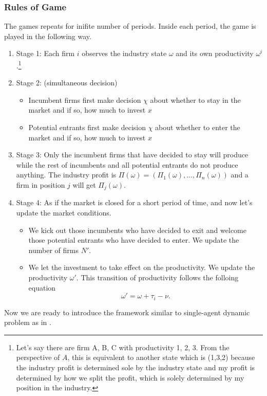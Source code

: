 \documentclass[12pt]{article}[margin=1in]
\begin{document}
\subsubsection{Rules of Game} The games repeats for inifite number of periods. Inside each period, the game is played in the following way.
\begin{enumerate}
    \item Stage 1: Each firm $i$ observes the industry state $\omega$ and its own productivity $\omega^i$.\footnote{Let's say there are firm A, B, C with productivity 1, 2, 3. From the perspective of $A$, this is equivalent to another state which is (1,3,2) because the industry profit is determined sole by the industry state and my profit is determined by how we split the profit, which is solely determined by my position in the industry.}
    \item Stage 2: (simultaneous decision)
    \begin{itemize}
        \item Incumbent firms first make decision $\chi$ about whether to stay in the market and if so, how much to invest $x$
        \item Potential entrants first make decision $\chi$ about whether to enter the market and if so, how much to invest $x$
    \end{itemize}
    \item Stage 3: Only the incumbent firms that have decided to stay will produce while the rest of incumbents and all potential entrants do not produce anything. The industry profit is $\Pi(\omega)=(\Pi_1(\omega),\ldots,\Pi_n(\omega))$ and a firm in position $j$ will get $\Pi_j(\omega)$.
    \item Stage 4: As if the market is closed for a short period of time, and now let's update the market conditions.
    \begin{itemize}
        \item We kick out those incumbents who have decided to exit and welcome those potential entrants who have decided to enter. We update the number of firms $N'$. 
        \item We let the investment to take effect on the productivity. We update the productivity $\omega'$. This transition of productivity follows the folloing equation $$\omega'=\omega+\tau_i-\nu.$$ 
    \end{itemize}
\end{enumerate}

Now we are ready to introduce the framework similar to single-agent dynamic problem as in \citet{rust1987optimal}. 
\end{document}

